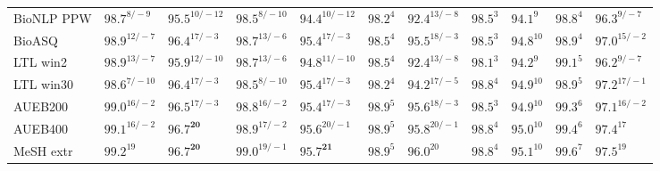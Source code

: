 \documentclass[letterpaper]{article} %
\begin{document}
\begin{table}[h]
\begin{tabular}{l l l l l l l l l l l}
BioNLP PPW & $98.7^{8/-9}$ & $95.5^{10/-12}$ & $98.5^{8/-10}$ & $94.4^{10/-12}$ & $98.2^{4}$ & $92.4^{13/-8}$ & $98.5^{3}$ & $94.1^{9}$ & $98.8^{4}$ & $96.3^{9/-7}$ \\
BioASQ & $98.9^{12/-7}$ & $96.4^{17/-3}$ & $98.7^{13/-6}$ & $95.4^{17/-3}$ & $98.5^{4}$ & $95.5^{18/-3}$ & $98.5^{3}$ & $94.8^{10}$ & $98.9^{4}$ & $97.0^{15/-2}$ \\
LTL win2 & $98.9^{13/-7}$ & $95.9^{12/-10}$ & $98.7^{13/-6}$ & $94.8^{11/-10}$ & $98.5^{4}$ & $92.4^{13/-8}$ & $98.1^{3}$ & $94.2^{9}$ & $99.1^{5}$ & $96.2^{9/-7}$ \\
LTL win30 & $98.6^{7/-10}$ & $96.4^{17/-3}$ & $98.5^{8/-10}$ & $95.4^{17/-3}$ & $98.2^{4}$ & $94.2^{17/-5}$ & $98.8^{4}$ & $94.9^{10}$ & $98.9^{5}$ & $97.2^{17/-1}$ \\
AUEB200 & $99.0^{16/-2}$ & $96.5^{17/-3}$ & $98.8^{16/-2}$ & $95.4^{17/-3}$ & $98.9^{5}$ & $95.6^{18/-3}$ & $98.5^{3}$ & $94.9^{10}$ & $99.3^{6}$ & $97.1^{16/-2}$ \\
AUEB400 & $99.1^{16/-2}$ & $\mathbf{96.7^{20}}$ & $98.9^{17/-2}$ & $95.6^{20/-1}$ & $98.9^{5}$ & $95.8^{20/-1}$ & $98.8^{4}$ & $95.0^{10}$ & $99.4^{6}$ & $97.4^{17}$ \\
MeSH extr & $99.2^{19}$ & $\mathbf{96.7^{20}}$ & $99.0^{19/-1}$ & $\mathbf{95.7^{21}}$ & $98.9^{5}$ & $96.0^{20}$ & $98.8^{4}$ & $95.1^{10}$ & $99.6^{7}$ & $97.5^{19}$ \\

\end{tabular}
\end{table}
\end{document}
